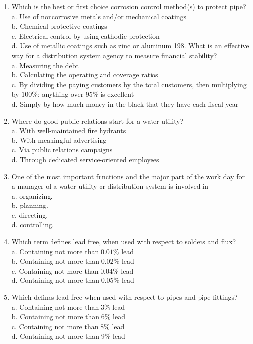 \documentclass[10pt]{article}
\begin{document}
\begin{enumerate}
  \item Which is the best or first choice corrosion control method(s) to protect pipe?\\
a. Use of noncorrosive metals and/or mechanical coatings\\
b. Chemical protective coatings\\
c. Electrical control by using cathodic protection\\
d. Use of metallic coatings such as zinc or aluminum 198. What is an effective way for a distribution system agency to measure financial stability?\\
a. Measuring the debt\\
b. Calculating the operating and coverage ratios\\
c. By dividing the paying customers by the total customers, then multiplying by $100 \%$; anything over $95 \%$ is excellent\\
d. Simply by how much money in the black that they have each fiscal year

  \item Where do good public relations start for a water utility?\\
a. With well-maintained fire hydrants\\
b. With meaningful advertising\\
c. Via public relations campaigns\\
d. Through dedicated service-oriented employees

  \item One of the most important functions and the major part of the work day for a manager of a water utility or distribution system is involved in\\
a. organizing.\\
b. planning.\\
c. directing.\\
d. controlling.

  \item Which term defines lead free, when used with respect to solders and flux?\\
a. Containing not more than $0.01 \%$ lead\\
b. Containing not more than $0.02 \%$ lead\\
c. Containing not more than $0.04 \%$ lead\\
d. Containing not more than $0.05 \%$ lead

  \item Which defines lead free when used with respect to pipes and pipe fittings?\\
a. Containing not more than $3 \%$ lead\\
b. Containing not more than $6 \%$ lead\\
c. Containing not more than 8\% lead\\
d. Containing not more than 9\% lead


\end{enumerate}
\end{document}
